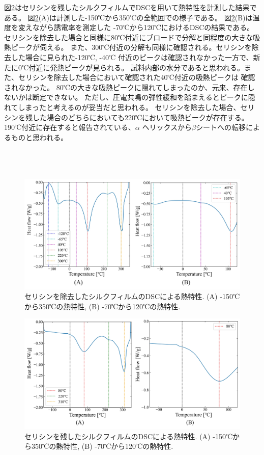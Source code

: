 \documentclass[dvipdfmx,12pt,a4paper]{jreport}
\begin{document}
		図\ref{セリシンありフィルムにおけるDSC}はセリシンを残したシルクフィルムでDSCを用いて熱特性を計測した結果である。
		図\ref{セリシンありフィルムにおけるDSC}(A)は計測した-150℃から350℃の全範囲での様子である。
		図\ref{セリシンありフィルムにおけるDSC}(B)は温度を変えながら誘電率を測定した
		-70℃から120℃におけるDSCの結果である。
		セリシンを除去した場合と同様に80℃付近にブロードで分解と同程度の大きな吸熱ピークが伺える。
		また、300℃付近の分解も同様に確認される。セリシンを除去した場合に見られた-120℃, -40℃
		付近のピークは確認されなかった一方で、新たに0℃付近に発熱ピークが見られる。
		試料内部の水分であると思われる。また、セリシンを除去した場合において確認された40℃付近の吸熱ピークは
		確認されなかった。
		80℃の大きな吸熱ピークに隠れてしまったのか、元来、存在しないかは断定できない。
		ただし、圧電共鳴の弾性緩和を踏まえるとピークに隠れてしまったと考えるのが妥当だと思われる。
		セリシンを除去した場合、セリシンを残した場合のどちらにおいても220℃において吸熱ピークが存在する。
		190℃付近に存在すると報告されている、$\alpha$ ヘリックスから$\beta$シートへの転移によるものと思われる。
		\\
		\\
		\\
		\\
	
		\begin{figure}[h]
			\centering
			\includegraphics[width=\linewidth]{熱プレスシルクフィルム_DSC.jpg}
			\caption{セリシンを除去したシルクフィルムのDSCによる熱特性. (A) -150℃から350℃の熱特性, 
			(B) -70℃から120℃の熱特性.}
			\label{セリシン除去フィルムにおけるDSC}
		\end{figure}
		\begin{figure}[H]
			\centering
			\includegraphics[width=\linewidth]{セリシンあり_熱プレスシルクフィルム_DSC.jpg}
			\caption{セリシンを残したシルクフィルムのDSCによる熱特性. (A) -150℃から350℃の熱特性, 
			(B) -70℃から120℃の熱特性.}
			\label{セリシンありフィルムにおけるDSC}
		\end{figure}
\end{document}

